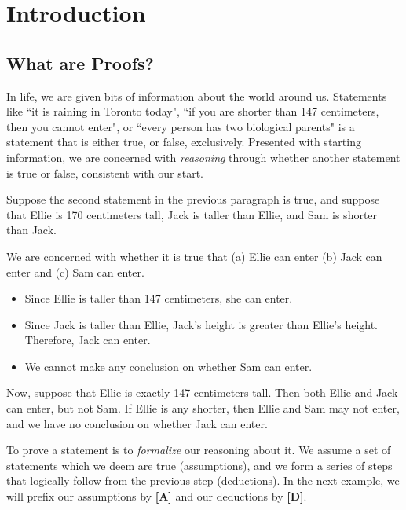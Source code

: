 \documentclass[../proofs.tex]{subfiles}
\newcommand{\assump}{\textbf{[A]}}
\newcommand{\deduct}{\textbf{[D]}}
\begin{document}
\chapter{Introduction}
\section{What are Proofs?}
In life, we are given bits of information about the world around us.
Statements like ``it is raining in Toronto today", ``if you are shorter than 147
centimeters, then you cannot enter", or ``every person has two biological
parents" is a statement that is either true, or false, exclusively. Presented
with starting information, we are concerned with \emph{reasoning} through
whether another statement is true or false, consistent with our start.

\begin{expl}
  Suppose the second statement in the previous paragraph is true, and
  suppose that Ellie is 170 centimeters tall, Jack is taller than Ellie, and Sam
  is shorter than Jack.

  We are concerned with whether it is true that (a) Ellie can enter (b) Jack
  can enter and (c) Sam can enter.

  \begin{itemize}
    \item Since Ellie is taller than 147 centimeters, she can enter.
    \item Since Jack is taller than Ellie, Jack's height is greater than
          Ellie's height. Therefore, Jack can enter.
    \item We cannot make any conclusion on whether Sam can enter.
  \end{itemize}

  Now, suppose that Ellie is exactly 147 centimeters tall. Then both Ellie and
  Jack can enter, but not Sam. If Ellie is any shorter, then Ellie and Sam may
  not enter, and we have no conclusion on whether Jack can enter.
\end{expl}
To prove a statement is to \emph{formalize} our reasoning about it. We assume a
set of statements which we deem are true (assumptions), and we form a series of
steps that logically follow from the previous step (deductions). In the next
example, we will prefix our assumptions by \assump{} and our deductions by
\deduct.
\end{document}
